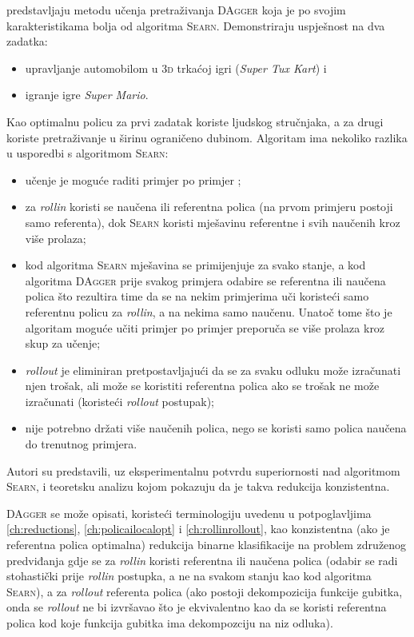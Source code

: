 \citet{ross2011reduction} predstavljaju metodu učenja pretraživanja
\textsc{DAgger}  koja je po svojim
karakteristikama bolja od algoritma \textsc{Searn}. Demonstriraju uspješnost na
dva zadatka:
\begin{itemize}
  \item upravljanje automobilom u \textsc{3d} trkaćoj igri (\textit{Super Tux
  Kart}) i
  \item igranje igre \textit{Super Mario}.
\end{itemize}
Kao optimalnu policu za prvi zadatak koriste ljudskog stručnjaka, a za drugi
koriste pretraživanje u širinu  ograničeno
dubinom. Algoritam ima nekoliko razlika u usporedbi s algoritmom \textsc{Searn}:
\begin{itemize}
  \item učenje je moguće raditi primjer po primjer ;
  \item za \textit{rollin} koristi se naučena ili referentna polica (na prvom
  primjeru postoji samo referenta), dok \textsc{Searn} koristi mješavinu
  referentne i svih naučenih kroz više prolaza;
  \item kod algoritma \textsc{Searn} mješavina se primijenjuje za svako stanje,
  a kod algoritma \textsc{DAgger} prije svakog primjera odabire se referentna
  ili naučena polica što rezultira time da se na nekim primjerima uči koristeći
  samo referentnu policu za \textit{rollin}, a na nekima samo naučenu. Unatoč
  tome što je algoritam moguće učiti primjer po primjer preporuča se više
  prolaza kroz skup za učenje;
  \item \textit{rollout} je eliminiran pretpostavljajući da se za svaku odluku
  može izračunati njen trošak, ali može se koristiti referentna polica ako se
  trošak ne može izračunati (koristeći \textit{rollout} postupak);
  \item nije potrebno držati više naučenih polica, nego se koristi samo polica
  naučena do trenutnog primjera.
\end{itemize}
Autori su predstavili, uz eksperimentalnu potvrdu superiornosti nad algoritmom
\textsc{Searn}, i teoretsku analizu kojom pokazuju da je takva redukcija
konzistentna.

\textsc{DAgger} se može opisati, koristeći terminologiju uvedenu u potpoglavljima
\ref{ch:reductions}, \ref{ch:policailocalopt} i \ref{ch:rollinrollout}, kao
konzistentna (ako je referentna polica optimalna) redukcija binarne
klasifikacije na problem združenog predviđanja gdje se za \textit{rollin}
koristi referentna ili naučena polica (odabir se radi stohastički prije
\textit{rollin} postupka, a ne na svakom stanju kao kod algoritma
\textsc{Searn}), a za \textit{rollout} referenta polica (ako postoji
dekompozicija funkcije gubitka, onda se \textit{rollout} ne bi izvršavao što je
ekvivalentno kao da se koristi referentna polica kod koje funkcija gubitka ima
dekompozciju na niz odluka).
